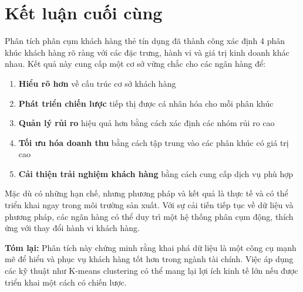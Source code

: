 \section{Kết luận cuối cùng}

Phân tích phân cụm khách hàng thẻ tín dụng đã thành công xác định 4 phân khúc khách hàng rõ ràng với các đặc trưng, hành vi và giá trị kinh doanh khác nhau. Kết quả này cung cấp một cơ sở vững chắc cho các ngân hàng để:

\begin{enumerate}
    \item \textbf{Hiểu rõ hơn} về cấu trúc cơ sở khách hàng
    \item \textbf{Phát triển chiến lược} tiếp thị được cá nhân hóa cho mỗi phân khúc
    \item \textbf{Quản lý rủi ro} hiệu quả hơn bằng cách xác định các nhóm rủi ro cao
    \item \textbf{Tối ưu hóa doanh thu} bằng cách tập trung vào các phân khúc có giá trị cao
    \item \textbf{Cải thiện trải nghiệm khách hàng} bằng cách cung cấp dịch vụ phù hợp
\end{enumerate}

Mặc dù có những hạn chế, nhưng phương pháp và kết quả là thực tế và có thể triển khai ngay trong môi trường sản xuất. Với sự cải tiến tiếp tục về dữ liệu và phương pháp, các ngân hàng có thể duy trì một hệ thống phân cụm động, thích ứng với thay đổi hành vi khách hàng.

\textbf{Tóm lại:} Phân tích này chứng minh rằng khai phá dữ liệu là một công cụ mạnh mẽ để hiểu và phục vụ khách hàng tốt hơn trong ngành tài chính. Việc áp dụng các kỹ thuật như K-means clustering có thể mang lại lợi ích kinh tế lớn nếu được triển khai một cách có chiến lược.
